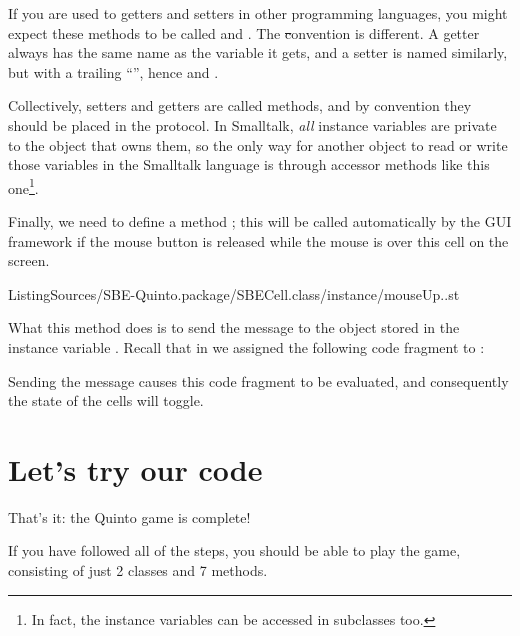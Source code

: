 \documentclass[a4paper,10pt,twoside]{book}
\begin{document}
If you are used to getters and setters in other programming languages, you might expect these methods to be called  and .
The \st convention is different.
A getter always has the same name as the variable it gets, and a setter is named similarly, but with a trailing ``\ct{:}'', hence  and .

Collectively, setters and getters are called   methods, and by convention they should be placed in the  protocol.
In Smalltalk, \emph{all} instance variables are private to the object that owns them, so the only way for another object to read or write those variables in the Smalltalk language is through accessor methods like this one\footnote{In fact, the instance variables can be accessed in subclasses too.}.


Finally, we need to define a method ; this will be called automatically by the GUI framework if the mouse button is released while the mouse is over this cell on the screen.

%
{ListingSources/SBE-Quinto.package/SBECell.class/instance/mouseUp..st}


What this method does is to send the message  to the object stored in the instance variable . 
Recall that in  we assigned the following code fragment to :


\noindent
Sending the  message causes this code fragment to be evaluated, and consequently the state of the cells will toggle.

\section{Let's try our code}

That's it: the Quinto game is complete!

If you have followed all of the steps, you should be able to play the game, consisting of just 2 classes and 7 methods.
\end{document}
